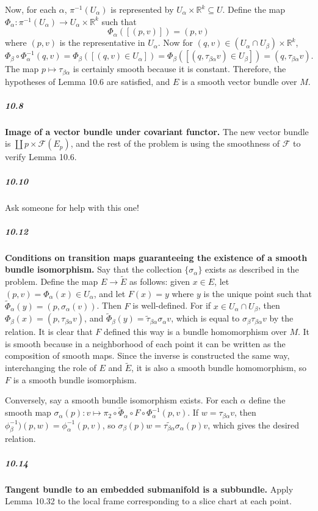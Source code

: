 \documentclass[10pt,letter]{article}
\begin{document}
Now, for each $\alpha$, $\pi^{-1}(U_{\alpha})$ is represented by $U_{\alpha} \times \mathbb{R}^k \subseteq U$. Define the map $\Phi_{\alpha}: \pi^{-1}(U_{\alpha}) \rightarrow U_{\alpha} \times \mathbb{R}^k$ such that \[ \Phi_{\alpha}([(p,v)]) = (p,v) \] where $(p,v)$ is the representative in $U_{\alpha}$. Now for  $(q,v) \in (U_{\alpha} \cap U_{\beta}) \times \mathbb{R}^k$,  \[ \Phi_{\beta} \circ \Phi_\alpha^{-1}(q,v) = \Phi_{\beta}([(q,v) \in U_{\alpha}]) = \Phi_{\beta}([(q,\tau_{\beta \alpha}v) \in U_{\beta}]) = (q,\tau_{\beta \alpha}v).\] The map $p \mapsto \tau_{\beta \alpha}$ is certainly smooth because it is constant. Therefore, the hypotheses of Lemma 10.6 are satisfied, and $E$ is a smooth vector bundle over $M$. 

\subparagraph{10.8} {\bf Image of a vector bundle under covariant functor.} The new vector bundle is $\coprod p \times \mathcal{F}(E_p)$, and the rest of the problem is using the smoothness of $\mathcal{F}$ to verify Lemma 10.6.

\subparagraph{10.10} Ask someone for help with this one!

\subparagraph{10.12} {\bf Conditions on transition maps guaranteeing the existence of a smooth bundle isomorphism.} Say that the collection $\lbrace \sigma_{\alpha} \rbrace$ exists as described in the problem. Define the map $E \rightarrow \tilde{E}$ as follows: given $x \in E$, let $(p,v) = \Phi_{\alpha}(x) \in U_{\alpha}$, and let $F(x) = y$ where $y$ is the unique point such that $\tilde{\Phi}_\alpha(y) = (p,\sigma_\alpha(v))$. Then $F$ is well-defined. For if $x \in U_{\alpha} \cap U_{\beta}$, then $\Phi_\beta(x) = (p,\tau_{\beta \alpha}v)$, and $\tilde{\Phi}_{\beta}(y) = \tilde{\tau}_{\beta \alpha} \sigma_\alpha v$, which is equal to $\sigma_\beta \tau_{\beta \alpha}v$ by the relation. It is clear that $F$ defined this way is a bundle homomorphism over $M$. It is smooth because in a neighborhood of each point it can be written as the composition of smooth maps. Since the inverse is constructed the same way, interchanging the role of $E$ and $\tilde{E}$, it is also a smooth bundle homomorphism, so $F$ is a smooth bundle isomorphism. 

Conversely, say a smooth bundle isomorphism exists. For each $\alpha$ define the smooth map $\sigma_\alpha(p): v \mapsto \pi_2 \circ  \tilde{\Phi}_{\alpha} \circ F \circ \Phi_{\alpha}^{-1}(p,v)$. If $w = \tau_{\beta \alpha}v$, then $\phi_{\beta}^{-1})(p,w) = \phi_{\alpha}^{-1}(p,v)$, so $\sigma_\beta(p)w = \tilde{\tau_{\beta \alpha}}\sigma_{\alpha}(p)v$, which gives the desired relation.

\subparagraph{10.14} {\bf Tangent bundle to an embedded submanifold is a subbundle.} Apply Lemma 10.32 to the local frame corresponding to a slice chart at each point.
 
\end{document}
